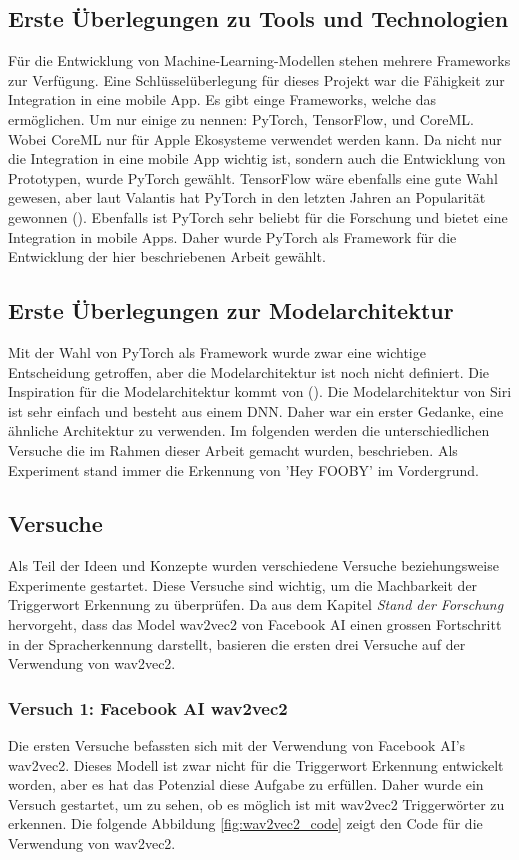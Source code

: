 \documentclass[11pt,a4paper]{article}
\begin{document}
\subsection{Erste Überlegungen zu Tools und Technologien}
Für die Entwicklung von Machine-Learning-Modellen stehen mehrere Frameworks zur Verfügung. Eine 
Schlüsselüberlegung für dieses Projekt war die Fähigkeit zur Integration in eine mobile App.
Es gibt einge Frameworks, welche das ermöglichen. Um nur einige zu nennen: PyTorch, TensorFlow, und 
CoreML. Wobei CoreML nur für Apple Ekosysteme verwendet werden kann. Da nicht nur die Integration
in eine mobile App wichtig ist, sondern auch die Entwicklung von Prototypen, wurde PyTorch gewählt.
TensorFlow wäre ebenfalls eine gute Wahl gewesen, aber laut Valantis hat PyTorch in den letzten 
Jahren an Popularität gewonnen (\cite{valantis2023battle}). Ebenfalls ist PyTorch sehr beliebt für 
die Forschung und bietet eine Integration in mobile Apps. Daher wurde PyTorch als Framework für die 
Entwicklung der hier beschriebenen Arbeit gewählt.

\subsection{Erste Überlegungen zur Modelarchitektur}
Mit der Wahl von PyTorch als Framework wurde zwar eine wichtige Entscheidung getroffen, aber die 
Modelarchitektur ist noch nicht definiert. Die Inspiration für die Modelarchitektur kommt von 
(\cite{siri2017hey}). Die Modelarchitektur von Siri ist sehr einfach und besteht aus einem DNN. 
Daher war ein erster Gedanke, eine ähnliche Architektur zu verwenden. Im folgenden werden die 
unterschiedlichen Versuche die im Rahmen dieser Arbeit gemacht wurden, beschrieben. Als Experiment 
stand immer die Erkennung von 'Hey FOOBY' im Vordergrund.

\subsection{Versuche}
Als Teil der Ideen und Konzepte wurden verschiedene Versuche beziehungsweise Experimente gestartet. 
Diese Versuche sind wichtig, um die Machbarkeit der Triggerwort Erkennung zu überprüfen. Da aus dem 
Kapitel \textit{Stand der Forschung} hervorgeht, dass das Model wav2vec2 von Facebook AI einen grossen 
Fortschritt in der Spracherkennung darstellt, basieren die ersten drei Versuche auf der Verwendung 
von wav2vec2.


\subsubsection{Versuch 1: Facebook AI wav2vec2}
Die ersten Versuche befassten sich mit der Verwendung von Facebook AI's wav2vec2. Dieses Modell 
ist zwar nicht für die Triggerwort Erkennung entwickelt worden, aber es hat das Potenzial diese 
Aufgabe zu erfüllen. Daher wurde ein Versuch gestartet, um zu sehen, ob es möglich ist mit wav2vec2 
Triggerwörter zu erkennen. Die folgende Abbildung \ref{fig:wav2vec2_code} zeigt den Code 
für die Verwendung von wav2vec2. 
\end{document}
